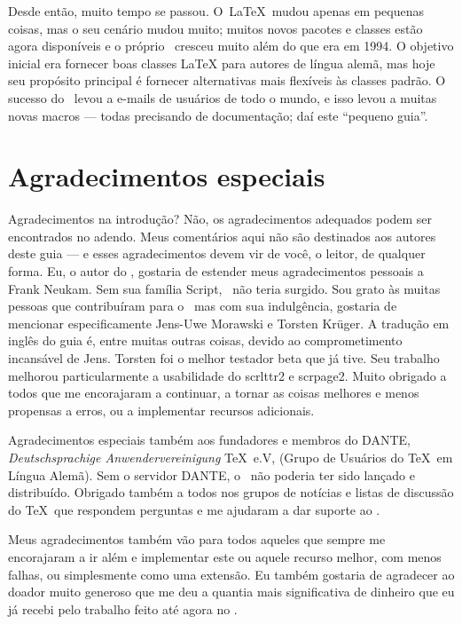 Desde então, muito tempo se passou. O\ LaTeX\ mudou apenas em pequenas coisas, mas o seu cenário mudou muito; muitos novos pacotes e classes estão agora disponíveis e o próprio \KOMAScript\ cresceu muito além do que era em 1994. O objetivo inicial era fornecer boas classes LaTeX para autores de língua alemã, mas hoje seu propósito principal é fornecer alternativas mais flexíveis às classes padrão. O sucesso do \KOMAScript\ levou a e-mails de usuários de todo o mundo, e isso levou a muitas novas macros — todas precisando de documentação; daí este “pequeno guia”.

\section{Agradecimentos especiais}
Agradecimentos na introdução? Não, os agradecimentos adequados podem ser encontrados no adendo. Meus comentários aqui não são destinados aos autores deste guia — e esses agradecimentos devem vir de você, o leitor, de qualquer forma. Eu, o autor do \KOMAScript, gostaria de estender meus agradecimentos pessoais a Frank Neukam. Sem sua família Script, \KOMAScript\ não teria surgido. Sou grato às muitas pessoas que contribuíram para o \KOMAScript\, mas com sua indulgência, gostaria de mencionar especificamente Jens-Uwe Morawski e Torsten Krüger. A tradução em inglês do guia é, entre muitas outras coisas, devido ao comprometimento incansável de Jens. Torsten foi o melhor testador beta que já tive. Seu trabalho melhorou particularmente a usabilidade do scrlttr2 e scrpage2. Muito obrigado a todos que me encorajaram a continuar, a tornar as coisas melhores e menos propensas a erros, ou a implementar recursos adicionais.

Agradecimentos especiais também aos fundadores e membros do DANTE, \textit{Deutschsprachige Anwendervereinigung} \TeX\ e.V, (Grupo de Usuários do \TeX\ em Língua Alemã). Sem o servidor DANTE, o \KOMAScript\ não poderia ter sido lançado e distribuído. Obrigado também a todos nos grupos de notícias e listas de discussão do \TeX\ que respondem perguntas e me ajudaram a dar suporte ao \KOMAScript.

Meus agradecimentos também vão para todos aqueles que sempre me encorajaram a ir além e implementar este ou aquele recurso melhor, com menos falhas, ou simplesmente como uma extensão. Eu também gostaria de agradecer ao doador muito generoso que me deu a quantia mais significativa de dinheiro que eu já recebi pelo trabalho feito até agora no \KOMAScript.
